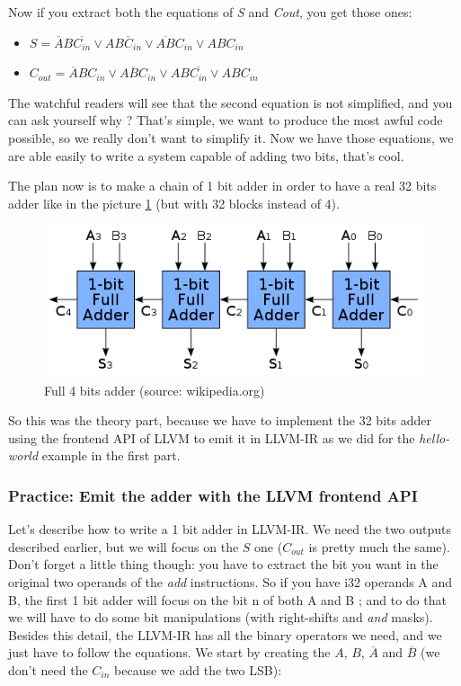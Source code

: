 \documentclass[a4paper, 11pt, notitlepage]{report}
\begin{document}
Now if you extract both the equations of \textit{S} and \textit{Cout}, you get those ones: 
\begin{itemize}
	\item $S = \overline{A} B \overline{C_{in}} \vee A \overline{B C_{in}} \vee  \overline{A B} C_{in} \vee A B C_{in}$
	\item  $C_{out} = \overline{A} B  C_{in} \vee A \overline{B} C_{in} \vee A B \overline{C_{in}} \vee A B C_{in}$
\end{itemize}
The watchful readers will see that the second equation is not simplified, and you can ask yourself why ? That's simple, we want to produce the most awful code possible, so we really don't want to simplify it. Now we have those equations, we are able easily to write a system capable of adding two bits, that's cool.

The plan now is to make a chain of 1 bit adder in order to have a real 32 bits adder like in the picture \ref{4bitsadder} (but with 32 blocks instead of 4).
\begin{figure}[H]
  \centering
  \includegraphics[scale=0.7]{pics/ripple-carry.png}
  \caption{Full 4 bits adder (source: wikipedia.org)}
  \label{4bitsadder}
\end{figure}

So this was the theory part, because we have to implement the 32 bits adder using the frontend API of LLVM to emit it in LLVM-IR as we did for the \textit{hello-world} example in the first part.

\subsubsection{Practice: Emit the adder with the LLVM frontend API}
Let's describe how to write a 1 bit adder in LLVM-IR. We need the two outputs described earlier, but we will focus on the $S$ one ($C_{out}$ is pretty much the same). Don't forget a little thing though: you have to extract the bit you want in the original two operands of the \textit{add} instructions. So if you have i32 operands A and B, the first 1 bit adder will focus on the bit n of both A and B ; and to do that we will have to do some bit manipulations (with right-shifts and \textit{and} masks).  Besides this detail, the LLVM-IR has all the binary operators we need, and we just have to follow the equations. We start by creating the $A$, $B$, $\overline{A}$ and $\overline{B}$ (we don't need the $C_{in}$ because we add the two LSB):
\end{document}
